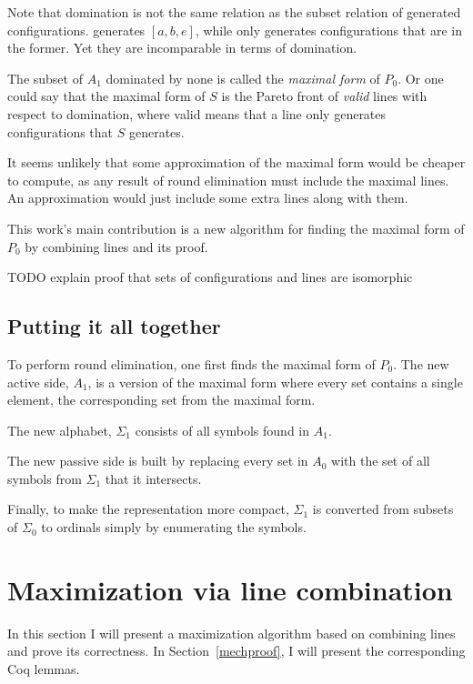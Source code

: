 \documentclass[english, 12pt, a4paper, sci, a-1b, online]{aaltothesis}
\begin{document}
Note that domination is not the same relation as the subset relation of generated configurations.  generates $[a, b, e]$, while  only generates configurations that are in the former. Yet they are incomparable in terms of domination.

The subset of $A_{1}$ dominated by none is called the \emph{maximal form} of $P_{0}$. Or one could say that the maximal form of $S$ is the Pareto front of \emph{valid} lines with respect to domination, where valid means that a line only generates configurations that $S$ generates.

It seems unlikely that some approximation of the maximal form would be cheaper to compute, as any result of round elimination must include the maximal lines. An approximation would just include some extra lines along with them.

This work's main contribution is a new algorithm for finding the maximal form of $P_{0}$ by combining lines and its proof.

TODO explain proof that sets of configurations and lines are isomorphic

\subsection{Putting it all together}

To perform round elimination, one first finds the maximal form of $P_0$. The new active side, $A_1$, is a version of the maximal form where every set contains a single element, the corresponding set from the maximal form.

The new alphabet, $\Sigma_1$ consists of all symbols found in $A_1$.

The new passive side is built by replacing every set in $A_0$ with the set of all symbols from $\Sigma_1$ that it intersects.

Finally, to make the representation more compact, $\Sigma_1$ is converted from subsets of $\Sigma_0$ to ordinals simply by enumerating the symbols.


\section{Maximization via line combination}\label{nlproof}

In this section I will present a maximization algorithm based on combining lines and prove its correctness. In Section~\ref{mechproof}, I will present the corresponding Coq lemmas.
\end{document}
